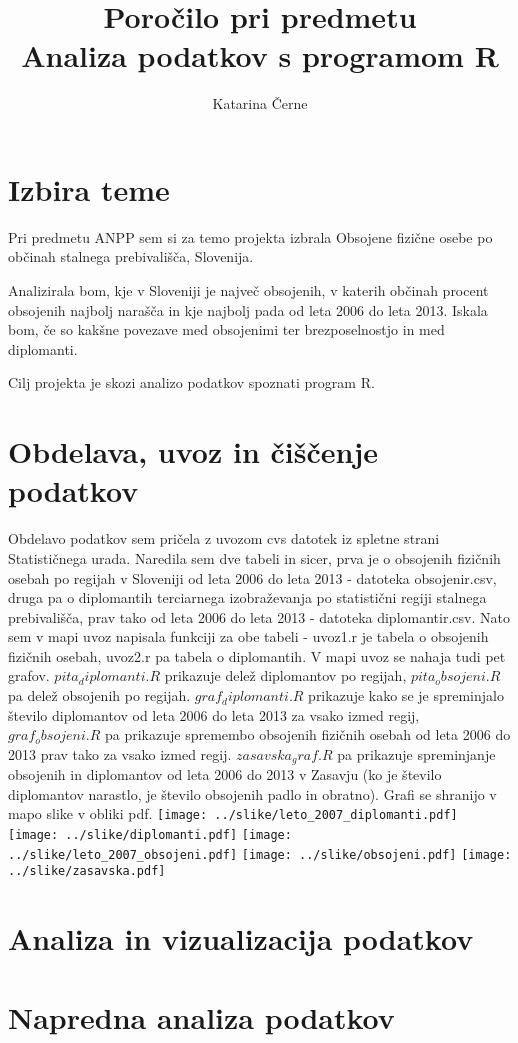 \documentclass[11pt,a4paper]{article}
\begin{document}
\title{Poročilo pri predmetu \\
Analiza podatkov s programom R}
\author{Katarina Černe}
\maketitle

\section{Izbira teme}

Pri predmetu ANPP sem si za temo projekta izbrala Obsojene fizične osebe po občinah stalnega prebivališča, Slovenija.

Analizirala bom, kje v Sloveniji je največ obsojenih, v katerih občinah procent obsojenih najbolj narašča in kje najbolj pada od leta 2006 do leta 2013. Iskala bom, če so kakšne povezave med obsojenimi ter brezposelnostjo in med diplomanti.

Cilj projekta je skozi analizo podatkov spoznati program R.

\section{Obdelava, uvoz in čiščenje podatkov}

Obdelavo podatkov sem pričela z uvozom cvs datotek iz spletne strani Statističnega urada.
Naredila sem dve tabeli in sicer, prva je o obsojenih fizičnih osebah po regijah v Sloveniji od leta 2006 do leta 2013 - datoteka obsojenir.csv, druga pa o diplomantih terciarnega izobraževanja po statistični regiji stalnega prebivališča, prav tako od leta 2006 do leta 2013 - datoteka diplomantir.csv.
Nato sem v mapi uvoz napisala funkciji za obe tabeli - uvoz1.r je tabela o obsojenih fizičnih osebah, uvoz2.r pa tabela o diplomantih.
V mapi uvoz se nahaja tudi pet grafov. $pita_diplomanti.R$ prikazuje delež diplomantov po regijah, $pita_obsojeni.R$ pa delež obsojenih po regijah. $graf_diplomanti.R$ prikazuje kako se je spreminjalo število diplomantov od leta 2006 do leta 2013 za vsako izmed regij, $graf_obsojeni.R$ pa prikazuje spremembo obsojenih fizičnih osebah od leta 2006 do 2013 prav tako za vsako izmed regij. $zasavska_graf.R$ pa prikazuje spreminjanje obsojenih in diplomantov od leta 2006 do 2013 v Zasavju (ko je število diplomantov narastlo, je število obsojenih padlo in obratno). Grafi se shranijo v mapo slike v obliki pdf.
\texttt{[image: ../slike/leto\_2007\_diplomanti.pdf]}
\texttt{[image: ../slike/diplomanti.pdf]}
\texttt{[image: ../slike/leto\_2007\_obsojeni.pdf]}
\texttt{[image: ../slike/obsojeni.pdf]}
\texttt{[image: ../slike/zasavska.pdf]}

\section{Analiza in vizualizacija podatkov}


\section{Napredna analiza podatkov}

\end{document}

